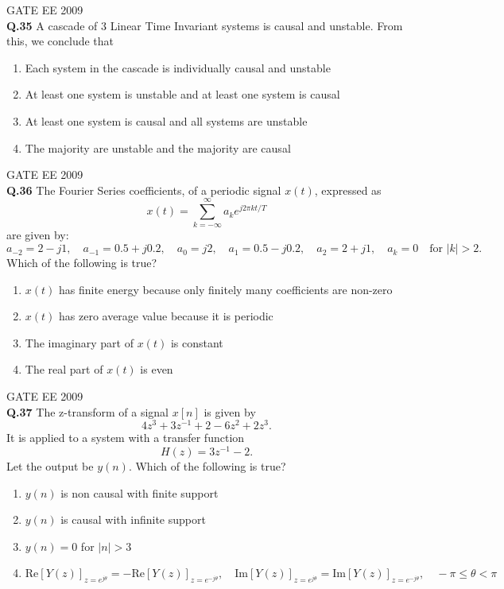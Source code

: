 \documentclass[12pt]{article}
\begin{document}
\vspace{0.5cm}
\hspace{10pt}
GATE EE 2009\\
\noindent\textbf{Q.35} A cascade of 3 Linear Time Invariant systems is causal and unstable. From this, we conclude that

\begin{enumerate}
    \item Each system in the cascade is individually causal and unstable
    \item At least one system is unstable and at least one system is causal
    \item At least one system is causal and all systems are unstable
    \item The majority are unstable and the majority are causal
\end{enumerate}

\vspace{0.5cm}
\hspace{10pt}
GATE EE 2009\\
\noindent\textbf{Q.36} The Fourier Series coefficients, of a periodic signal $x(t)$, expressed as
\[
x(t) = \sum_{k = -\infty}^\infty a_k e^{j 2 \pi k t / T}
\]
are given by:
\[
a_{-2} = 2 - j1, \quad a_{-1} = 0.5 + j0.2, \quad a_{0} = j2, \quad a_{1} = 0.5 - j0.2, \quad a_{2} = 2 + j1, \quad a_k = 0 \quad \text{for } |k| > 2.
\]
Which of the following is true?

\begin{enumerate}
    \item $x(t)$ has finite energy because only finitely many coefficients are non-zero
    \item $x(t)$ has zero average value because it is periodic
    \item The imaginary part of $x(t)$ is constant
    \item The real part of $x(t)$ is even
\end{enumerate}

\vspace{1cm}

\hspace{10pt}
GATE EE 2009\\

\noindent\textbf{Q.37} The z-transform of a signal $x[n]$ is given by
\[
4 z^{3} + 3 z^{-1} + 2 - 6 z^{2} + 2 z^{3}.
\]
It is applied to a system with a transfer function 
\[
H(z) = 3 z^{-1} - 2.
\]
Let the output be $y(n)$. Which of the following is true?

\begin{enumerate}
    \item $y(n)$ is non causal with finite support
    \item $y(n)$ is causal with infinite support
    \item $y(n) = 0$ for $|n| > 3$
    \item \(\mathrm{Re}[Y(z)]_{z = e^{j \theta}} = - \mathrm{Re}[Y(z)]_{z = e^{-j \theta}}, \quad \mathrm{Im}[Y(z)]_{z = e^{j \theta}} = \mathrm{Im}[Y(z)]_{z = e^{-j \theta}}, \quad -\pi \leq \theta < \pi\)
\end{enumerate}
\end{document}
